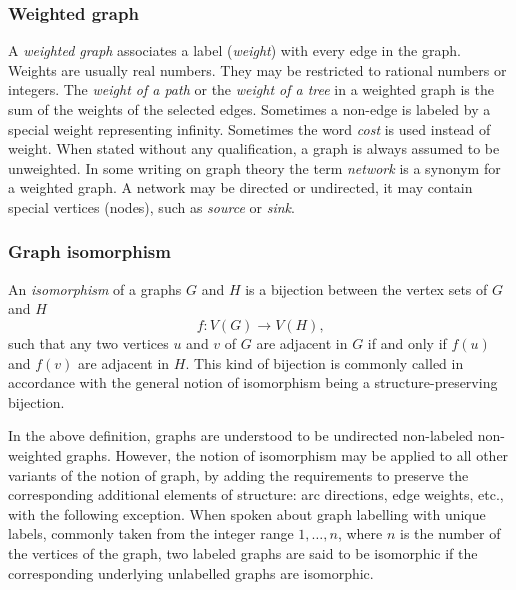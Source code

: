     \subsubsection{Weighted graph}
    
      A \emph{weighted graph} associates a label (\emph{weight}) with every edge in the graph. Weights are usually real numbers. They may be restricted to rational numbers or integers. The \emph{weight of a path} or the \emph{weight of a tree} in a weighted graph is the sum of the weights of the selected edges. Sometimes a non-edge is labeled by a special weight representing infinity. Sometimes the word \emph{cost} is used instead of weight. When stated without any qualification, a graph is always assumed to be unweighted. In some writing on graph theory the term \emph{network} is a synonym for a weighted graph. A network may be directed or undirected, it may contain special vertices (nodes), such as \emph{source} or \emph{sink}. 
    
    \subsubsection{Graph isomorphism}
        
      An \emph{isomorphism} of a graphs $G$ and $H$ is a bijection between the vertex sets of $G$ and $H$
      \begin{equation}
        f: V(G) \rightarrow V(H)\mbox{,}
      \end{equation}
      such that any two vertices $u$ and $v$ of $G$ are adjacent in $G$ if and only if $f(u)$ and $f(v)$ are adjacent in $H$. This kind of bijection is commonly called  in accordance with the general notion of isomorphism being a structure-preserving bijection.
        
      In the above definition, graphs are understood to be undirected non-labeled non-weighted graphs. However, the notion of isomorphism may be applied to all other variants of the notion of graph, by adding the requirements to preserve the corresponding additional elements of structure: arc directions, edge weights, etc., with the following exception. When spoken about graph labelling with unique labels, commonly taken from the integer range $1,\ldots,n$, where $n$ is the number of the vertices of the graph, two labeled graphs are said to be isomorphic if the corresponding underlying unlabelled graphs are isomorphic.
      
